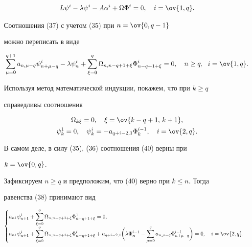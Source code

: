 \begin{equation} 


L\psi^i-\lambda\psi^i-A\alpha^i+\Omega\Phi^i=0,\quad 


i=\ov{1,q}. 


\end{equation} 


Соотношения (37) с учетом (35) при $n=\ov{0,q-1}$ 


можно переписать в виде 


\begin{equation} 


\sum^{q+1}_{\mu=0}a_{n,\mu-q}\psi^i_{n+\mu-q}-\lambda\psi^i_n+ 


\sum^q_{\xi=0}\Omega_{n,n-q+1+\xi}\Phi^i_{n-q+1+\xi}=0, 


\quad n\ge q,\ \;i=\ov{1,q}. 


\end{equation} 


 


Используя метод математической индукции, покажем, что при $k\ge q$ 


справедливы соотношения 


\begin{gather} 


\Omega_{k\xi}=0,\quad \xi=\ov{k-q+1,\,k+1}, \\ 


\psi^1_k=0,\quad \psi^i_k=-a_{q+i-2,1}\Phi^{i-1}_k,\quad 


i=\ov{2,q}. 


\end{gather} 


В самом деле, в силу (35), (36) соотношения (40) верны при 


$k=\ov{0,q}$. 


Зафиксируем $n\ge q$ и предположим, что (40) верно при $k\le n$. Тогда 


равенства (38) принимают вид 


\begin{equation} 


\begin{cases} 


\displaystyle a_{n1}\psi^1_{n+1}+\sum^q_{\xi=0} 


\Omega_{n,n-q+1+\xi}\Phi^1_{n-q+1+\xi}=0, \\ 


%


\displaystyle a_{n1}\psi^i_{n+1}+\sum^q_{\xi=0} 


\Omega_{n,n-q+1+\xi}\Phi^i_{n-q+1+\xi}+ 


a_{q+i-2,1}\bigg(\lambda\Phi^{i-1}_n-\sum^q_{\mu=0} 


a_{n,\mu-q}\Phi^{i-1}_{n+\mu-q}\bigg)=0,\quad i=\ov{2,q}. 


\end{cases} 


\end{equation} 


